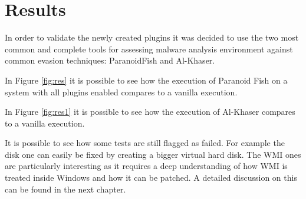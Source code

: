 \section{Results}

In order to validate the newly created plugins it was decided to use the two most common and complete tools for assessing malware analysis environment against common evasion techniques: ParanoidFish and Al-Khaser.

In Figure \ref{fig:res} it is possible to see how the execution of Paranoid Fish on a system with all plugins enabled compares to a vanilla execution. 

In Figure \ref{fig:res1} it is possible to see how the execution of Al-Khaser compares to a vanilla execution. 


It is possible to see how some tests are still flagged as failed. For example the disk one can easily be fixed by creating a bigger virtual hard disk. The WMI ones are particularly interesting as it requires a deep understanding of how WMI is treated inside Windows and how it can be patched. A detailed discussion on this can be found in the next chapter. 


